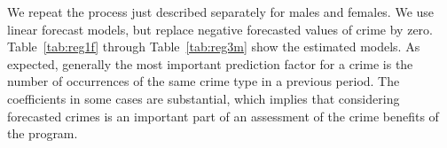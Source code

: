 %

%

\noindent We repeat the process just described separately for males and females. We use linear forecast models, but replace negative forecasted values of crime by zero. Table~\ref{tab:reg1f} through Table~\ref{tab:reg3m} show the estimated models. As expected, generally the most important prediction factor for a crime is the number of occurrences of the same crime type in a previous period. The coefficients in some cases are substantial, which implies that considering forecasted crimes is an important part of an assessment of the crime benefits of the program.

